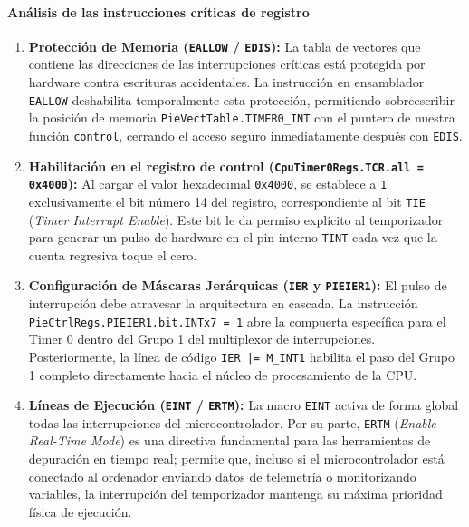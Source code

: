 \documentclass[11pt,fleqn]{book} %
\begin{document}
\paragraph{Análisis de las instrucciones críticas de registro}

\begin{enumerate}
	\item \textbf{Protección de Memoria (\texttt{EALLOW} / \texttt{EDIS}):} La tabla de vectores que contiene las direcciones de las interrupciones críticas está protegida por hardware contra escrituras accidentales. La instrucción en ensamblador \texttt{EALLOW} deshabilita temporalmente esta protección, permitiendo sobreescribir la posición de memoria \texttt{PieVectTable.TIMER0\_INT} con el puntero de nuestra función \texttt{control}, cerrando el acceso seguro inmediatamente después con \texttt{EDIS}.
	
	\item \textbf{Habilitación en el registro de control (\texttt{CpuTimer0Regs.TCR.all = 0x4000}):} Al cargar el valor hexadecimal \texttt{0x4000}, se establece a \texttt{1} exclusivamente el bit número 14 del registro, correspondiente al bit \texttt{TIE} (\textit{Timer Interrupt Enable}). Este bit le da permiso explícito al temporizador para generar un pulso de hardware en el pin interno \texttt{TINT} cada vez que la cuenta regresiva toque el cero.
	
	\item \textbf{Configuración de Máscaras Jerárquicas (\texttt{IER} y \texttt{PIEIER1}):} El pulso de interrupción debe atravesar la arquitectura en cascada. La instrucción \texttt{PieCtrlRegs.PIEIER1.bit.INTx7 = 1} abre la compuerta específica para el Timer 0 dentro del Grupo 1 del multiplexor de interrupciones. Posteriormente, la línea de código \texttt{IER |= M\_INT1} habilita el paso del Grupo 1 completo directamente hacia el núcleo de procesamiento de la CPU.
	
	\item \textbf{Líneas de Ejecución (\texttt{EINT} / \texttt{ERTM}):} La macro \texttt{EINT} activa de forma global todas las interrupciones del microcontrolador. Por su parte, \texttt{ERTM} (\textit{Enable Real-Time Mode}) es una directiva fundamental para las herramientas de depuración en tiempo real; permite que, incluso si el microcontrolador está conectado al ordenador enviando datos de telemetría o monitorizando variables, la interrupción del temporizador mantenga su máxima prioridad física de ejecución.
\end{enumerate}
\end{document}
